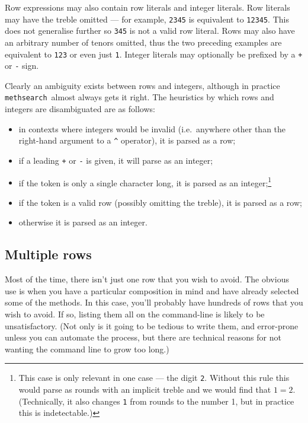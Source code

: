 \documentclass[a4paper,11pt,oneside]{book}
\def\methsearch{\texttt{meth\-search}}
\begin{document}
Row expressions may also contain row literals and integer literals.
Row literals may have the treble omitted --- for example,
\verb+2345+ is equivalent to \verb+12345+.  This does not generalise
further so \verb+345+ is not a valid row literal.  Rows may also have 
an arbitrary number of tenors omitted, thus the two preceding examples
are equivalent to \verb+123+ or even just \verb+1+.  
Integer literals may optionally be prefixed by a \verb-+- or \verb+-+ sign.

Clearly an ambiguity exists between rows and integers, although in practice
\methsearch\ almost always gets it right.  The heuristics by which rows
and integers are disambiguated are as follows:
\begin{itemize}\renewcommand{\labelitemi}{---}
\item in contexts where integers would be invalid (i.e.\ anywhere other
than the right-hand argument to a \verb+^+ operator), it is parsed as a row;
\item if a leading \verb-+- or \verb+-+ is given, it will parse as an integer;
\item if the token is only a single character long, it is parsed as an 
integer;\footnote{This case is only relevant in one case --- the digit 
\verb+2+.  Without this rule this would parse as rounds with an implicit 
treble and we would find that $1 = 2$.  (Technically, it also changes \verb+1+
from rounds to the number 1, but in practice this is indetectable.)}
\item if the token is a valid row (possibly omitting the treble), it is 
parsed as a row;
\item otherwise it is parsed as an integer.
\end{itemize}

\subsection{Multiple rows}\label{rowexprmulti}

Most of the time, there isn't just one row that you wish to avoid.
The obvious use is when you have a particular composition in mind and have
already selected some of the methods.  In this case, you'll probably have
hundreds of rows that you wish to avoid.
If so, listing them all on the command-line is likely to be unsatisfactory.
(Not only is it going to be tedious to write them, and error-prone unless
you can automate the process, but there are technical reasons for not
wanting the command line to grow too long.)
\end{document}
